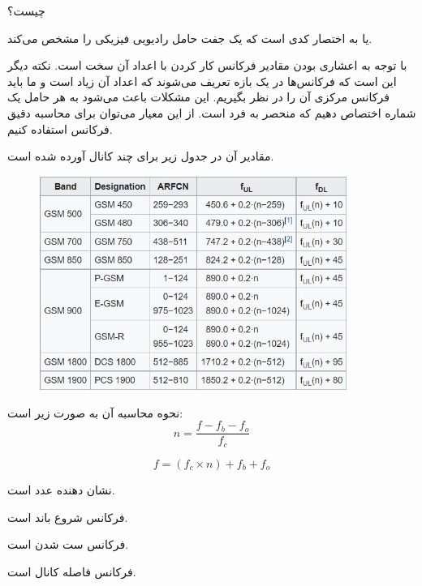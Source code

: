 \Problem
{ چیست؟}
{
یا به اختصار
کدی است که یک جفت حامل رادیویی فیزیکی را مشخص می‌کند.

با توجه به اعشاری بودن مقادیر فرکانس کار کردن با اعداد آن سخت است.
نکته دیگر این است که فرکانس‌ها در یک بازه تعریف می‌شوند که اعداد آن زیاد است و ما باید فرکانس مرکزی آن را در نظر بگیریم.
این مشکلات باعث می‌شود به هر حامل یک شماره اختصاص دهیم که منحصر به فرد است. از این معیار می‌توان برای محاسبه دقیق فرکانس استفاده کنیم.

مقادیر آن در جدول زیر برای چند کانال آورده شده است.
\begin{figure}[H]
    \includegraphics[width=10cm]{Images/ARFCN.jpg}
    \centering
    \caption{}
\end{figure}

نحوه محاسبه آن به صورت زیر است:
\begin{equation*}
    n = \frac{f - f_b - f_o}{f_c}
\end{equation*}

\begin{equation*}
    f = (f_c \times n) + f_b + f_o
\end{equation*}

نشان دهنده عدد
است.

فرکانس شروع باند است.

فرکانس ست شدن است.

فرکانس فاصله کانال است.
}
